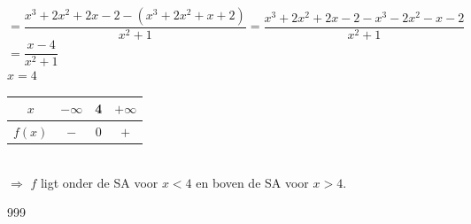 \documentclass[a4paper]{article}
\begin{document}
$= \dfrac{x^3 + 2x^2 + 2x - 2 - (x^3 + 2x^2 + x + 2)}{x^2+1} = \dfrac{x^3 + 2x^2 + 2x - 2 - x^3 - 2x^2 - x - 2}{x^2+1}$ \\

$= \dfrac{x - 4}{x^2+1}$ \\

$x = 4$  \\

\begin{tabular}{c|ccc}
$x$ & $-\infty$ & 4 & $+\infty$\\ \hline
$f(x)$ & $-$ & $0$ & $+$  \\
\end{tabular} \\

$\Rightarrow$ $f$ ligt onder de SA voor $x < 4$ en boven de SA voor $x > 4$. \\

\begin{thebibliography}{999}
\end{thebibliography}
\end{document}
